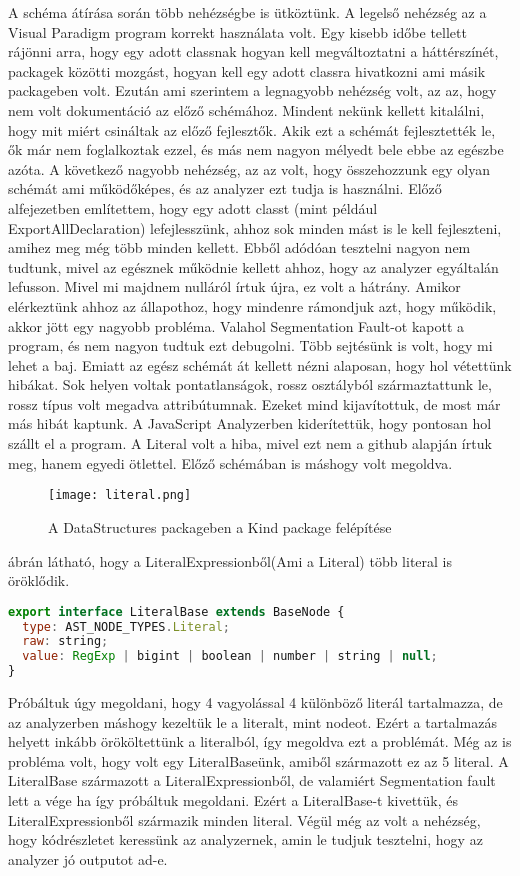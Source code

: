 \noindent

A schéma átírása során több nehézségbe is ütköztünk.
A legelső nehézség az a Visual Paradigm program korrekt használata volt.
Egy kisebb időbe tellett rájönni arra, hogy egy adott classnak hogyan kell megváltoztatni a háttérszínét, packagek közötti mozgást, hogyan kell egy adott classra hivatkozni ami másik packageben volt.
Ezután ami szerintem a legnagyobb nehézség volt, az az, hogy nem volt dokumentáció az előző schémához.
Mindent nekünk kellett kitalálni, hogy mit miért csináltak az előző fejlesztők. Akik ezt a schémát fejlesztették le, ők már nem foglalkoztak ezzel, és más nem nagyon mélyedt bele ebbe az egészbe azóta.
A következő nagyobb nehézség, az az volt, hogy összehozzunk egy olyan schémát ami működőképes, és az analyzer ezt tudja is használni.
Előző alfejezetben említettem, hogy egy adott classt (mint például ExportAllDeclaration) lefejlesszünk, ahhoz sok minden mást is le kell fejleszteni, amihez meg még több minden kellett.
Ebből adódóan tesztelni nagyon nem tudtunk, mivel az egésznek működnie kellett ahhoz, hogy az analyzer egyáltalán lefusson.
Mivel mi majdnem nulláról írtuk újra, ez volt a hátrány.
Amikor elérkeztünk ahhoz az állapothoz, hogy mindenre rámondjuk azt, hogy működik, akkor jött egy nagyobb probléma.
Valahol Segmentation Fault-ot kapott a program, és nem nagyon tudtuk ezt debugolni.
Több sejtésünk is volt, hogy mi lehet a baj. Emiatt az egész schémát át kellett nézni alaposan, hogy hol vétettünk hibákat.
Sok helyen voltak pontatlanságok, rossz osztályból származtattunk le, rossz típus volt megadva attribútumnak. Ezeket mind kijavítottuk, de most már más hibát kaptunk.
A JavaScript Analyzerben kiderítettük, hogy pontosan hol szállt el a program.
A Literal volt a hiba, mivel ezt nem a github alapján írtuk meg, hanem egyedi ötlettel. Előző schémában is máshogy volt megoldva.
\begin{figure}[!htbp]
      \caption{A DataStructures packageben a Kind package felépítése}\label{fig:literal}
      \centering
      \texttt{[image: literal.png]}
\end{figure}

 ábrán látható, hogy a LiteralExpressionből(Ami a Literal) több literal is öröklődik.
\begin{lstlisting}[caption={Literal},label={lst:asg_file_literal}, language={JavaScript}]
export interface LiteralBase extends BaseNode {
  type: AST_NODE_TYPES.Literal;
  raw: string;
  value: RegExp | bigint | boolean | number | string | null;
}
\end{lstlisting}
Próbáltuk úgy megoldani, hogy 4 vagyolással 4 különböző literál tartalmazza, de az analyzerben máshogy kezeltük le a literalt, mint nodeot.
Ezért a tartalmazás helyett inkább örököltettünk a literalból, így megoldva ezt a problémát.
Még az is probléma volt, hogy volt egy LiteralBaseünk, amiből származott ez az 5 literal. A LiteralBase származott a LiteralExpressionből, de valamiért Segmentation fault lett a vége ha így próbáltuk megoldani.
Ezért a LiteralBase-t kivettük, és LiteralExpressionből származik minden literal.
Végül még az volt a nehézség, hogy kódrészletet keressünk az analyzernek, amin le tudjuk tesztelni, hogy az analyzer jó outputot ad-e.

